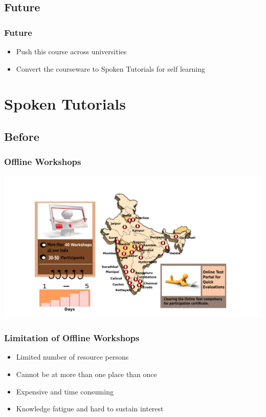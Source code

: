 \documentclass[compress,red]{beamer} %
\begin{document}
\subsection{Future}
\begin{frame}
\frametitle{Future}
\begin{itemize}
\item Push this course across universities
\item Convert the courseware to Spoken Tutorials for self learning
\end{itemize}
\end{frame}

\section{Spoken Tutorials}
\subsection{Before}
\begin{frame}
\frametitle{Offline Workshops}
\includegraphics[scale=.15]{workshop.png}
\end{frame}

\begin{frame}
\frametitle{Limitation of Offline Workshops}
\begin{itemize}
\item Limited number of resource persons
\item Cannot be at more than one place than once
\item Expensive and time consuming
\item Knowledge fatigue and hard to sustain interest
\end{itemize}
\end{frame}
\end{document}
